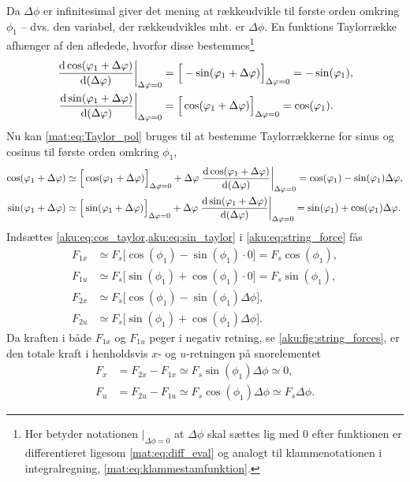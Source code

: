 Da $\Delta\phi$ er infinitesimal giver det mening at rækkeudvikle til første orden omkring $\phi_1$ -- dvs. den variabel, der rækkeudvikles mht. er $\Delta\phi$. En funktions Taylorrække afhænger af den afledede, hvorfor disse bestemmes\footnote{Her betyder notationen $|_{\Delta\phi=0}$ at $\Delta\phi$ skal sættes lig med 0 efter funktionen er differentieret ligesom \cref{mat:eq:diff_eval} og analogt til klammenotationen i integralregning, \cref{mat:eq:klammestamfunktion}.}
%
\begin{align}
    \left.\dv{\cos(\varphi_1+\Delta\varphi)}{(\Delta\varphi)}\right|_{\Delta\varphi=0} &= \Big[-\sin(\varphi_1+\Delta\varphi)\Big]_{\Delta\varphi=0} = -\sin(\varphi_1), \\
    \left.\dv{\sin(\varphi_1+\Delta\varphi)}{(\Delta\varphi)}\right|_{\Delta\varphi=0} &= \Big[\cos(\varphi_1+\Delta\varphi)\Big]_{\Delta\varphi=0} = \cos(\varphi_1).
\end{align}
%
Nu kan \cref{mat:eq:Taylor_pol} bruges til at bestemme Taylorrækkerne for sinus og cosinus til første orden omkring $\phi_1$,
%
\begin{align}
    \cos(\varphi_1+\Delta\varphi) &\simeq \Big[\cos(\varphi_1+\Delta\varphi)\Big]_{\Delta\varphi=0} + \Delta\varphi\left.\dv{\cos(\varphi_1+\Delta\varphi)}{(\Delta\varphi)}\right|_{\Delta\varphi=0} = \cos(\varphi_1) - \sin(\varphi_1)\Delta\varphi, \label{aku:eq:cos_taylor}\\
    \sin(\varphi_1+\Delta\varphi) &\simeq \Big[\sin(\varphi_1+\Delta\varphi)\Big]_{\Delta\varphi=0} + \Delta\varphi\left.\dv{\sin(\varphi_1+\Delta\varphi)}{(\Delta\varphi)}\right|_{\Delta\varphi=0} = \sin(\varphi_1) + \cos(\varphi_1)\Delta\varphi. \label{aku:eq:sin_taylor}
\end{align}
%
Indsættes \cref{aku:eq:cos_taylor,aku:eq:sin_taylor} i \cref{aku:eq:string_force} fås
%
\begin{subequations}
\begin{align}
    F_{1x} &\simeq F_s\big[\cos(\phi_1) - \sin(\phi_1)\cdot0] = F_s\cos(\phi_1), \\
    F_{1u} &\simeq F_s\big[\sin(\phi_1) + \cos(\phi_1)\cdot0\big] = F_s\sin(\phi_1), \\
    F_{2x} &\simeq F_s\Big[\cos(\phi_1) - \sin(\phi_1)\Delta\phi], \\
    F_{2u} &\simeq F_s\Big[\sin(\phi_1) + \cos(\phi_1)\Delta\phi\Big].
\end{align}
\end{subequations}
%
Da kraften i både $F_{1x}$ og $F_{1u}$ peger i negativ retning, se \cref{aku:fig:string_forces}, er den totale kraft i henholdsvis $x$- og $u$-retningen på snorelementet
%
\begin{subequations} \label{aku:eq:f}
\begin{align}
    F_x &= F_{2x} - F_{1x} \simeq F_s\sin(\phi_1)\Delta\phi \simeq 0, \label{aku:eq:fx}\\
    F_u &= F_{2u} - F_{1u} \simeq F_s\cos(\phi_1)\Delta\phi \simeq F_s\Delta\phi. \label{aku:eq:fu}
\end{align}
\end{subequations}
